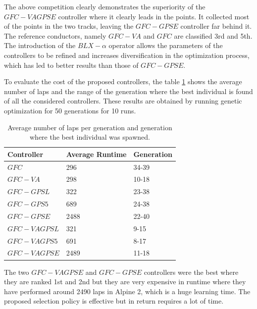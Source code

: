 \documentclass[10pt,journal,compsoc]{IEEEtran}
\begin{document}
The above competition clearly demonstrates the superiority of the $GFC-VAGPSE$ controller where it clearly leads in the points. It collected most of the points in the two tracks, leaving the $GFC-GPSE$ controller far behind it. The reference conductors, namely $GFC-VA$ and $GFC$  are classified 3rd and 5th.
The introduction of the $BLX-\alpha$ operator allows the parameters of the controllers to be refined and  increases diversification in the optimization process, which has led to better results than those of $GFC-GPSE$.

To evaluate the cost of the proposed controllers, the table \ref{tab:time} shows the average number of laps %
and the range of the generation where the best individual is found of all the considered controllers. These results are obtained by running genetic
optimization for 50 generations for 10 runs.  

\begin{table}[!ht]
	\centering
	{\scriptsize
          \caption{Average number of laps per generation %
            and
                  generation where the best individual was spawned.}
		\label{tab:time}
		\begin{tabular}{|p{2.85cm}|p{1.65cm}|p{1.65cm}|}
			\hline 	
			\hline  
			Controller& \textbf{Average Runtime}&\textbf{Generation}\\
                  \hline \textbf{\textbf{$GFC$}}&296 &34-39\\
			\hline \textbf{$GFC-VA$}&298	&10-18\\	
			\hline \textbf{$GFC-GPSL$}& 322&23-38\\	
			\hline \textbf{$GFC-GPS5$}&689	&24-38\\	
			\hline \textbf{$GFC-GPSE$}&	2488&22-40\\	
			\hline \textbf{$GFC-VAGPSL$}&321	&9-15\\	
			\hline\textbf{$GFC-VAGPS5$}&	691&8-17\\	
			\hline\textbf{$GFC-VAGPSE$}&2489	&11-18\\					
			\hline 
		\end{tabular}
		
	}
\end{table} 

The two $GFC-VAGPSE$ and $GFC-GPSE$ controllers were the best where they are ranked 1st and 2nd but they are very expensive in runtime where they have performed around 2490 laps in Alpine 2, which is a huge learning time.
The proposed selection policy is effective but in return requires a lot of time.
\end{document}
